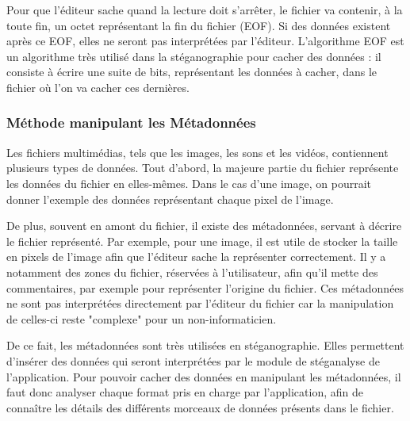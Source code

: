 \documentclass[11pt]{article}
\begin{document}
Pour que l'éditeur sache quand la lecture doit s'arrêter, le fichier va contenir, à la toute fin, un octet représentant la fin du fichier (EOF). 
Si des données existent après ce EOF, elles ne seront pas interprétées par l'éditeur. 
L'algorithme EOF est un algorithme très utilisé dans la stéganographie pour cacher des données : il consiste à écrire une suite de bits, représentant les données à cacher, dans le fichier où l'on va cacher ces dernières. 

\subsubsection{Méthode manipulant les Métadonnées}
Les fichiers multimédias, tels que les images, les sons et les vidéos, contiennent plusieurs types de données. 
Tout d'abord, la majeure partie du fichier représente les données du fichier en elles-mêmes. Dans le cas d'une image, on pourrait donner l'exemple des données représentant chaque pixel de l'image. 

De plus, souvent en amont du fichier, il existe des métadonnées, servant à décrire le fichier représenté. Par exemple, pour une image, il est utile de stocker la taille en pixels de l'image afin que l'éditeur sache la représenter correctement. 
Il y a notamment des zones du fichier, réservées à l'utilisateur, afin qu'il mette des commentaires, par exemple pour représenter l'origine du fichier. 
Ces métadonnées ne sont pas interprétées directement par l'éditeur du fichier car la manipulation de celles-ci reste "complexe" pour un non-informaticien. 

De ce fait, les métadonnées sont très utilisées en stéganographie. Elles permettent d'insérer des données qui seront interprétées par le module de stéganalyse de l'application. 
Pour pouvoir cacher des données en manipulant les métadonnées, il faut donc analyser chaque format pris en charge par l'application, afin de connaître les détails des différents morceaux de données présents dans le fichier. 
\end{document}
